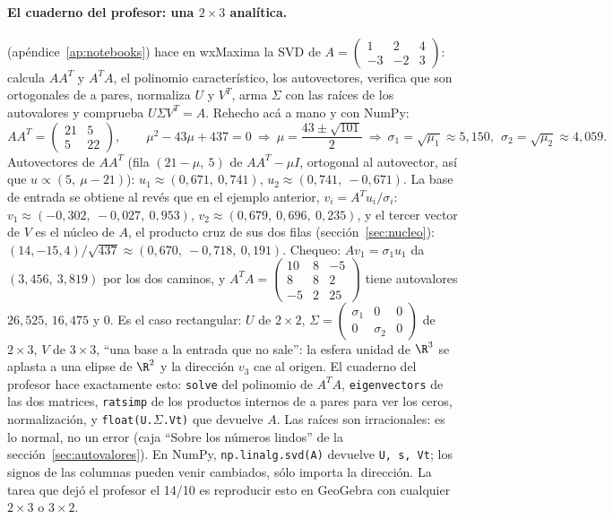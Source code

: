 \paragraph{El cuaderno del profesor: una \texorpdfstring{$2\times3$}{2x3} analítica.}
 (apéndice~\ref{ap:notebooks}) hace en wxMaxima la SVD de
\(A=\begin{pmatrix}1&2&4\\-3&-2&3\end{pmatrix}\): calcula \(AA^T\) y \(A^TA\), el
polinomio característico, los autovectores, verifica que son ortogonales de a pares,
normaliza \(U\) y \(V^T\), arma \(\Sigma\) con las raíces de los autovalores y comprueba
\(U\Sigma V^T=A\). Rehecho acá a mano y con NumPy:
\[
  AA^T=\begin{pmatrix}21&5\\5&22\end{pmatrix},\qquad
  \mu^2-43\mu+437=0\ \Rightarrow\ \mu=\frac{43\pm\sqrt{101}}2
  \ \Rightarrow\ \sigma_1=\sqrt{\mu_1}\approx5{,}150,\ \ \sigma_2=\sqrt{\mu_2}\approx4{,}059 .
\]
Autovectores de \(AA^T\) (fila \((21-\mu,\ 5)\) de \(AA^T-\mu I\), ortogonal al autovector,
así que \(u\propto(5,\ \mu-21)\)): \(u_1\approx(0{,}671,\ 0{,}741)\),
\(u_2\approx(0{,}741,\ -0{,}671)\). La base de entrada se obtiene al revés que en el
ejemplo anterior, \(v_i=A^Tu_i/\sigma_i\):
\(v_1\approx(-0{,}302,\ -0{,}027,\ 0{,}953)\), \(v_2\approx(0{,}679,\ 0{,}696,\ 0{,}235)\),
y el tercer vector de \(V\) es el núcleo de \(A\), el producto cruz de sus dos filas
(sección~\ref{sec:nucleo}): \((14,-15,4)/\sqrt{437}\approx(0{,}670,\ -0{,}718,\ 0{,}191)\).
Chequeo: \(Av_1=\sigma_1u_1\) da \((3{,}456,\ 3{,}819)\) por los dos caminos, y
\(A^TA=\begin{pmatrix}10&8&-5\\8&8&2\\-5&2&25\end{pmatrix}\) tiene autovalores
\(26{,}525\), \(16{,}475\) y \(0\). Es el caso rectangular: \(U\) de \(2\times2\),
\(\Sigma=\begin{pmatrix}\sigma_1&0&0\\0&\sigma_2&0\end{pmatrix}\) de \(2\times3\), \(V\) de
\(3\times3\), ``una base a la
entrada que no sale'': la esfera unidad de \(\R^3\) se aplasta a una elipse de
\(\R^2\) y la dirección \(v_3\) cae al origen. El cuaderno del profesor hace exactamente esto: \texttt{solve} del polinomio de
\(A^TA\), \texttt{eigenvectors} de las dos matrices, \texttt{ratsimp} de los productos
internos de a pares para ver los ceros, normalización, y \texttt{float(U.\(\Sigma\).Vt)}
que devuelve \(A\). Las raíces son irracionales: es lo normal, no un error
(caja ``Sobre los números lindos'' de la sección~\ref{sec:autovalores}). En NumPy,
\texttt{np.linalg.svd(A)} devuelve \texttt{U, s, Vt}; los signos de las columnas pueden
venir cambiados, sólo importa la dirección. La tarea que dejó el profesor el 14/10 es
reproducir esto en GeoGebra con cualquier \(2\times3\) o \(3\times2\).


